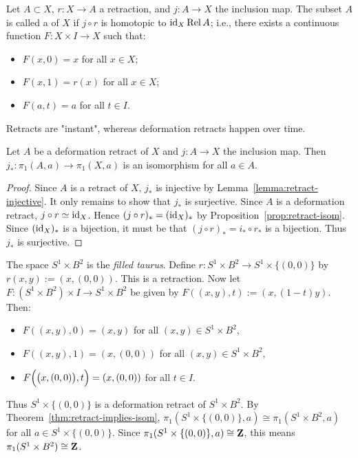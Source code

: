 \begin{definition}
    Let $A \subset X$, $r:X \rightarrow A$ a retraction, and $j:A \rightarrow X$ the inclusion map. The subset $A$ is called a  of $X$ if $j \circ r$ is homotopic to $\operatorname{id}_X \operatorname{Rel} A$; i.e., there exists a continuous function $F:X \times I \rightarrow X$ such that:
    \begin{itemize}[itemsep=1pt,topsep=3pt]
        \item $F(x,0) = x$ for all $x \in X$;
        \item $F(x,1) = r(x)$ for all $x \in X$;
        \item $F(a,t) = a$ for all $t \in I$.
    \end{itemize}
\end{definition}

\begin{remark}
    Retracts are "instant", whereas deformation retracts happen over time.
\end{remark}

\begin{theorem}\label{thm:retract-implies-isom}
    Let $A$ be a deformation retract of $X$ and $j:A \rightarrow X$ the inclusion map. Then $j_\ast:\pi_1(A,a) \rightarrow \pi_1(X,a)$ is an isomorphism for all $a \in A$.
\end{theorem}   
    \begin{proof}
        Since $A$ is a retract of $X$, $j_\ast$ is injective by Lemma~\ref{lemma:retract-injective}. It only remains to show that $j_\ast$ is surjective. Since $A$ is a deformation retract, $j \circ r \simeq \operatorname{id}_X$. Hence $(j \circ r)_\ast = (\operatorname{id}_X)_\ast$ by Proposition~\ref{prop:retract-isom}. Since $(\operatorname{id}_X)_\ast$ is a bijection, it must be that $(j \circ r)_\ast = i_\ast \circ r_\ast$ is a bijection. Thus $j_\ast$ is surjective.
    \end{proof}

\begin{example}
    The space $S^1 \times B^2$ is the \textit{filled taurus}. Define $r:S^1 \times B^2 \rightarrow S^1 \times \{(0,0)\}$ by $r(x,y) := (x, (0,0))$. This is a retraction. Now let $F:(S^1 \times B^2) \times I \rightarrow S^1 \times B^2$ be given by $F((x,y),t) := (x,(1-t)y)$. Then:
        \begin{itemize}[itemsep=1pt,topsep=3pt]
            \item $F((x,y),0) = (x,y)$ for all $(x,y) \in S^1 \times B^2$,
            \item $F((x,y),1) = (x,(0,0))$ for all $(x,y) \in S^1 \times B^2$,
            \item $F\Bigl(\bigl(x,(0,0)\bigr),t\Bigr) = (x,(0,0))$ for all $t \in I$.
        \end{itemize}
    Thus $S^1 \times \{(0,0)\}$ is a deformation retract of $S^1 \times B^2$. By Theorem~\ref{thm:retract-implies-isom}, $\pi_1(S^1 \times \{(0,0)\},a) \cong \pi_1(S^1 \times B^2,a)$ for all $a \in S^1 \times \{(0,0)\}$. Since $\pi_1(S^1 \times \{(0,0)\},a) \cong \mathbf{Z}$, this means $\pi_1(S^1 \times B^2) \cong \mathbf{Z}$.
\end{example}

